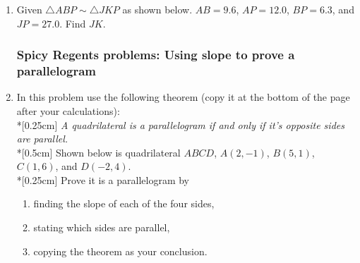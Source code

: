 \documentclass[12pt, twoside]{article}
\begin{document}
\begin{enumerate}
\item Given $\triangle ABP \sim \triangle JKP$ as shown below. $AB=9.6$, $AP=12.0$, $BP=6.3$, and $JP=27.0$. Find $JK$.
  \begin{flushright}
    \end{flushright}
    \vspace{2cm}

\newpage
  \subsubsection*{Spicy Regents problems: Using slope to prove a parallelogram}
\item In this problem use the following theorem (copy it at the bottom of the page after your calculations): \\*[0.25cm]
    \emph{A quadrilateral is a parallelogram if and only if it's opposite sides are parallel.}\\*[0.5cm]
    Shown below is quadrilateral $ABCD$, $A(2,-1)$, $B(5,1)$, $C(1,6)$, and $D(-2,4)$. \\*[0.25cm]
    Prove it is a parallelogram by
    \begin{enumerate}
      \item finding the slope of each of the four sides,
      \item stating which sides are parallel,
      \item copying the theorem as your conclusion.
    \end{enumerate}
    \begin{flushright} %
    \end{flushright}
  
\newpage

\end{enumerate}
\end{document}
